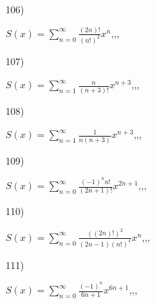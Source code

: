 \documentclass[11pt, ukrainian]{article}
\begin{document}
\par
\vspace{0.9cm}
106) \space 
{%
{$S(x)=\sum\limits_{n=0}^{\infty}{\frac{(2n)!}{(n!)^2}}{x^{n}}$},,, \par \smallskip  
}
\par
\vspace{0.9cm}
107) \space 
{%
{$S(x)=\sum\limits_{n=1}^{\infty}{\frac{n}{(n+3)!}}{x^{{n+3}}}$},,, \par \smallskip  
}
\par
\vspace{0.9cm}
108) \space 
{%
{$S(x)=\sum\limits_{n=1}^{\infty}{\frac{1}{n(n+3)}}{x^{{n+3}}}$},,, \par \smallskip  
}
\par
\vspace{0.9cm}
109) \space 
{%
{$S(x)=\sum\limits_{n=0}^{\infty}{\frac{{(-1)^n}{n!}}{(2n+1)!}}{x^{{2n+1}}}$},,, \par \smallskip  
}
\par
\vspace{0.9cm}
110) \space 
{%
{$S(x)=\sum\limits_{n=0}^{\infty}{\frac{((2n)!)^2}{(2n-1)(n!)^4}}{x^{{n}}}$},,, \par \smallskip  
}
\par
\newpage
111) \space 
{%
{$S(x)=\sum\limits_{n=0}^{\infty}{\frac{(-1)^n}{6n+1}}{x^{{6n+1}}}$},,, \par \smallskip  
}
\end{document}
